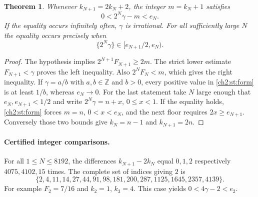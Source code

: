 \documentclass[11pt,a4paper,oneside,openany]{report}
\newtheorem{theorem}{Theorem}[section]
\theoremstyle{remark}\newtheorem{remark}[theorem]{Remark}
\numberwithin{equation}{section}
\begin{document}
\begin{theorem}\label{ch2:st:carry}
Whenever $k_{N+1}=2k_N+2$, the integer $m=k_N+1$ satisfies
\begin{equation}
 0<2^N\gamma-m<e_N.\label{ch2:st:form}
\end{equation}
If the equality occurs infinitely often, $\gamma$ is irrational.
For all sufficiently large $N$ the equality occurs precisely when
\begin{equation}
 \{2^N\gamma\}\in[e_{N+1}/2,e_N).\label{ch2:st:window}
\end{equation}
\end{theorem}
\begin{proof}
The hypothesis implies $2^{N+1}F_{N+1}\ge2m$. The strict lower estimate $F_{N+1}<\gamma$ proves the left inequality. Also $2^NF_N<m$, which gives the right inequality. If $\gamma=a/b$ with $a,b\in\mathbb Z$ and $b>0$, every positive value in \eqref{ch2:st:form} is at least $1/b$, whereas $e_N\to0$. For the last statement take $N$ large enough that $e_N,e_{N+1}<1/2$ and write $2^N\gamma=n+x$, $0\le x<1$. If the equality holds, \eqref{ch2:st:form} forces $m=n$, $0<x<e_N$, and the next floor requires $2x\ge e_{N+1}$. Conversely those two bounds give $k_N=n-1$ and $k_{N+1}=2n$.
\end{proof}

\paragraph{Certified integer comparisons.}
For all $1\le N\le8192$, the differences $k_{N+1}-2k_N$ equal $0,1,2$ respectively $4075,4102,15$ times. The complete set of indices giving $2$ is
\begin{equation}
 \{2,4,11,14,27,44,91,98,181,200,287,1125,1645,2357,4139\}.\label{ch2:st:list}
\end{equation}
For example $F_2=7/16$ and $k_2=1$, $k_3=4$. This case yields $0<4\gamma-2<e_2$.
\end{document}
